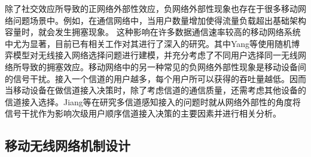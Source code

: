 除了社交效应所导致的正网络外部性效应，负网络外部性现象也存在于很多移动网络问题场景中。例如，在通信网络中，当用户数量增加使得流量负载超出基础架构容量时，就会发生拥塞现象。
这种影响在许多数据通信速率较高的移动网络系统中尤为显著，目前已有相关工作对其进行了深入的研究\cite{Asuman07,Fang09,Tran12,rayliu2,rayliu3}。其中Yang等\cite{rayliu2}使用随机博弈模型对无线接入网络选择问题进行建模，并充分考虑了不同用户选择同一无线网络所导致的拥塞效应。移动网络中的另一种常见的负网络外部性现象是移动设备间的信号干扰。接入一个信道的用户越多，每个用户所可以获得的吞吐量越低。因而当移动设备在做信道接入决策时，除了考虑信道的通信质量，还需考虑其他设备的信道接入选择。Jiang等\cite{rayliu1}在研究多信道感知接入的问题时就从网络外部性的角度将信号干扰作为影响次级用户顺序信道接入决策的主要因素并进行相关分析。

\iffalse
\subsection{移动无线网络机制设计}
